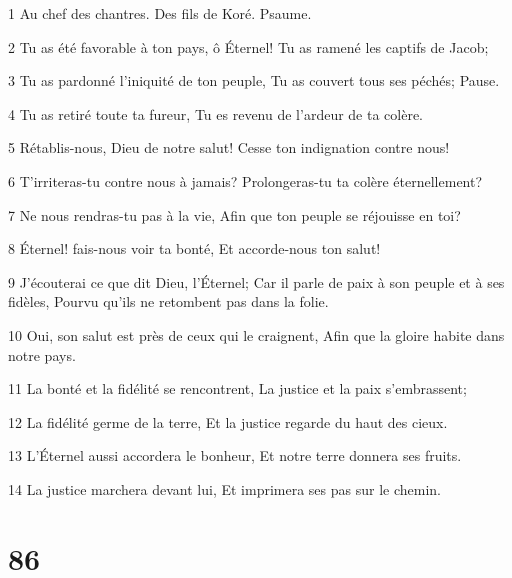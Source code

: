\par 1 Au chef des chantres. Des fils de Koré. Psaume.
\par 2 Tu as été favorable à ton pays, ô Éternel! Tu as ramené les captifs de Jacob;
\par 3 Tu as pardonné l'iniquité de ton peuple, Tu as couvert tous ses péchés; Pause.
\par 4 Tu as retiré toute ta fureur, Tu es revenu de l'ardeur de ta colère.
\par 5 Rétablis-nous, Dieu de notre salut! Cesse ton indignation contre nous!
\par 6 T'irriteras-tu contre nous à jamais? Prolongeras-tu ta colère éternellement?
\par 7 Ne nous rendras-tu pas à la vie, Afin que ton peuple se réjouisse en toi?
\par 8 Éternel! fais-nous voir ta bonté, Et accorde-nous ton salut!
\par 9 J'écouterai ce que dit Dieu, l'Éternel; Car il parle de paix à son peuple et à ses fidèles, Pourvu qu'ils ne retombent pas dans la folie.
\par 10 Oui, son salut est près de ceux qui le craignent, Afin que la gloire habite dans notre pays.
\par 11 La bonté et la fidélité se rencontrent, La justice et la paix s'embrassent;
\par 12 La fidélité germe de la terre, Et la justice regarde du haut des cieux.
\par 13 L'Éternel aussi accordera le bonheur, Et notre terre donnera ses fruits.
\par 14 La justice marchera devant lui, Et imprimera ses pas sur le chemin.

\chapter{86}

